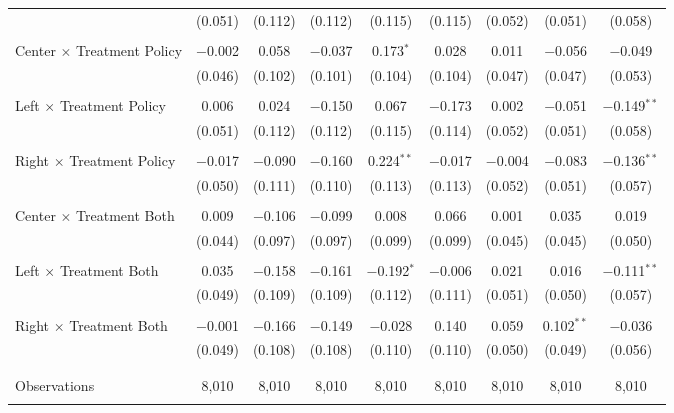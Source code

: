\begin{tabular}{@{\extracolsep{5pt}}lcccccccc}
  & (0.051) & (0.112) & (0.112) & (0.115) & (0.115) & (0.052) & (0.051) & (0.058) \\ 
  & & & & & & & & \\ 
 Center $\times$ Treatment Policy & $-$0.002 & 0.058 & $-$0.037 & 0.173$^{*}$ & 0.028 & 0.011 & $-$0.056 & $-$0.049 \\ 
  & (0.046) & (0.102) & (0.101) & (0.104) & (0.104) & (0.047) & (0.047) & (0.053) \\ 
  & & & & & & & & \\ 
 Left $\times$ Treatment Policy & 0.006 & 0.024 & $-$0.150 & 0.067 & $-$0.173 & 0.002 & $-$0.051 & $-$0.149$^{**}$ \\ 
  & (0.051) & (0.112) & (0.112) & (0.115) & (0.114) & (0.052) & (0.051) & (0.058) \\ 
  & & & & & & & & \\ 
 Right $\times$ Treatment Policy & $-$0.017 & $-$0.090 & $-$0.160 & 0.224$^{**}$ & $-$0.017 & $-$0.004 & $-$0.083 & $-$0.136$^{**}$ \\ 
  & (0.050) & (0.111) & (0.110) & (0.113) & (0.113) & (0.052) & (0.051) & (0.057) \\ 
  & & & & & & & & \\ 
 Center $\times$ Treatment Both & 0.009 & $-$0.106 & $-$0.099 & 0.008 & 0.066 & 0.001 & 0.035 & 0.019 \\ 
  & (0.044) & (0.097) & (0.097) & (0.099) & (0.099) & (0.045) & (0.045) & (0.050) \\ 
  & & & & & & & & \\ 
 Left $\times$ Treatment Both & 0.035 & $-$0.158 & $-$0.161 & $-$0.192$^{*}$ & $-$0.006 & 0.021 & 0.016 & $-$0.111$^{**}$ \\ 
  & (0.049) & (0.109) & (0.109) & (0.112) & (0.111) & (0.051) & (0.050) & (0.057) \\ 
  & & & & & & & & \\ 
 Right $\times$ Treatment Both & $-$0.001 & $-$0.166 & $-$0.149 & $-$0.028 & 0.140 & 0.059 & 0.102$^{**}$ & $-$0.036 \\ 
  & (0.049) & (0.108) & (0.108) & (0.110) & (0.110) & (0.050) & (0.049) & (0.056) \\ 
  & & & & & & & & \\ 
\hline \\[-1.8ex] 

Observations & 8,010 & 8,010 & 8,010 & 8,010 & 8,010 & 8,010 & 8,010 & 8,010 \\ 
\hline 
\hline \\[-1.8ex] 
\end{tabular} 